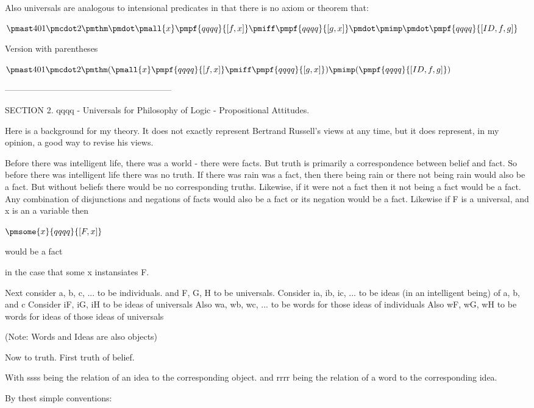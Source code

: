 \documentclass[12pt]{article}
\begin{document}
Also universals are analogous to intensional predicates in that there is no axiom or theorem that:

$\pmast 401 \pmcdot 2 \pmthm \pmdot \pmall{x} \pmpf{qqqq}{[f, x]} \pmiff \pmpf{qqqq}{[g, x]} \pmdot \pmimp \pmdot \pmpf{qqqq}{[ID, f, g]} $
 
 

Version with parentheses

$\pmast 401 \pmcdot 2 \pmthm  (  \pmall{x} \pmpf{qqqq}{[f, x]} \pmiff \pmpf{qqqq}{[g, x]}  ) \pmimp (  \pmpf{qqqq}{[ID, f, g]} )$


-----------------------------------------------------------

SECTION 2. qqqq - Universals for Philosophy of Logic - Propositional Attitudes.

Here is a background for my theory. It does not exactly
represent Bertrand Russell's views at any time, but it
does represent, in my opinion, a good way to revise
his views.

Before there was intelligent life, there was a world - there were facts.
But truth is primarily a correspondence between belief and fact.
So before there was intelligent life there was no truth.
If there was rain was a fact, then there being rain or there not
being rain would also be a fact. But without beliefs there would be
no corresponding truths.
Likewise, if it were not a fact then it not being a fact would be a fact.
Any combination of disjunctions and negations of facts would also
be a fact or its negation would be a fact.
Likewise if F is a universal, and x is an a variable then

$\pmsome{x}{qqqq}{[F,x]}$

would be a fact

in the case that some x instansiates F.

Next consider a, b, c, ... to be individuals.
and F, G, H to be universals. 
Consider ia, ib, ic, ... to be ideas (in an intelligent being) of a, b, and c
Consider iF, iG, iH to be ideas of universals
Also wa, wb, wc, ... to be words for those ideas of individuals
Also wF, wG, wH to be words for ideas of those ideas of universals

(Note: Words and Ideas are also objects)

Now to truth. First truth of belief.

With ssss being the relation of an idea to the corresponding object.
and rrrr being the relation of a word to the corresponding idea.

By thest simple conventions:
\end{document}

